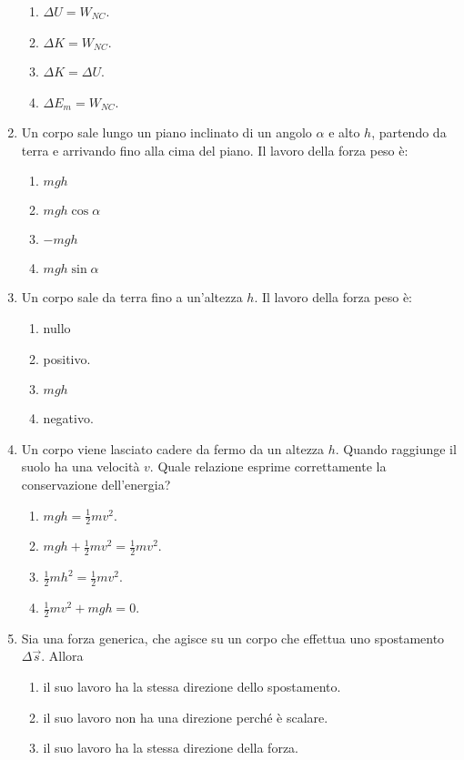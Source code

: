 \documentclass{article}
\begin{document}
\begin{enumerate}
\begin{enumerate}[label=\Alph*.]
    \item $\Delta U=W_{NC}$.
    \item $\Delta K=W_{NC}.$
    \item $\Delta K = \Delta U$.
    \item $\Delta E_m=W_{NC}$.
  \end{enumerate}
  \item Un corpo sale lungo un piano inclinato di un angolo $\alpha$ e alto $h$, partendo da terra e arrivando fino alla cima del piano. Il lavoro della forza peso è:
  \begin{enumerate}[label=\Alph*.]
    \item $mgh$
    \item $mgh\cos\alpha$
    \item $-mgh$
    \item $mgh\sin\alpha$
  \end{enumerate}
  \item Un corpo sale da terra fino a un'altezza $h$. Il lavoro della forza peso è:
  \begin{enumerate}[label=\Alph*.]
    \item nullo
    \item positivo.
    \item $mgh$
    \item negativo.
  \end{enumerate}
  \item Un corpo viene lasciato cadere da fermo da un altezza $h$. Quando raggiunge il suolo ha una velocità $v$. Quale relazione esprime correttamente la conservazione dell'energia?
  \begin{enumerate}[label=\Alph*.]
    \item $mgh=\frac{1}{2}mv^2$.
    \item $mgh+\frac{1}{2}mv^2=\frac{1}{2}mv^2.$
    \item $\frac{1}{2}mh^2=\frac{1}{2}mv^2$.
    \item $\frac{1}{2}mv^2+mgh=0.$
  \end{enumerate}
  \item Sia  una forza generica, che agisce su un corpo che effettua uno spostamento $\Delta \vec{s}$. Allora
  \begin{enumerate}[label=\Alph*.]
    \item il suo lavoro ha la stessa direzione dello spostamento.
    \item il suo lavoro non ha una direzione perché è scalare.
    \item il suo lavoro ha la stessa direzione della forza.

\end{enumerate}
\end{enumerate}
\end{document}
